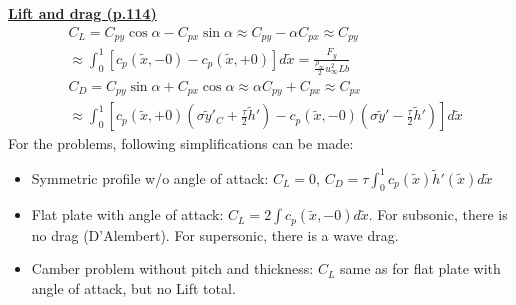 \documentclass[8pt, landscape, fleqn]{scrartcl}
\begin{document}
\begin{multicols*}{3}
\underline{\textbf{Lift and drag (p.114)}} \\
\begin{align*}
    &C_L = C_{py} \cos \alpha - C_{px} \sin \alpha \approx C_{py} - \alpha C_{px} \approx C_{py} \\
    &\approx \int_0^1 \left[c_p(\tilde{x},-0)-c_p(\tilde{x},+0)\right] d\tilde{x} = \frac{F_y}{\frac{\rho_\infty}{2} u_\infty^2 Lb}\\
    &C_D = C_{py} \sin \alpha + C_{px} \cos \alpha \approx \alpha C_{py} + C_{px} \approx C_{px} \\
    &\approx \int_0^1 \left[  c_p(\tilde{x},+0)\left( \sigma \tilde{y}'_C + \frac{\tau}{2} \tilde{h}' \right) - c_p(\tilde{x},-0)\left( \sigma\tilde{y}'-\frac{\tau}{2}\tilde{h}' \right)\right] d\tilde{x}
\end{align*}
For the problems, following simplifications can be made:
\begin{itemize}
    \item Symmetric profile w/o angle of attack: $C_L = 0$, $C_D = \tau\int_0^1 c_p(\tilde{x})\tilde{h}'(\tilde{x}) d\tilde{x}$ 
    \item Flat plate with angle of attack: $C_L = 2 \int c_p(\tilde{x},-0)d\tilde{x}$. For subsonic, there is no drag (D'Alembert). For supersonic, there is a wave drag.
    \item Camber problem without pitch and thickness: $C_L$ same as for flat plate with angle of attack, but no Lift total.
\end{itemize}

\end{multicols*}
\end{document}
